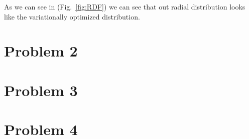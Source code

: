 As we can see in (Fig.~\ref{fig:RDF}) we can see that out radial distribution looks like the variationally optimized distribution.

\section*{Problem 2}


\section*{Problem 3}



\section*{Problem 4}


